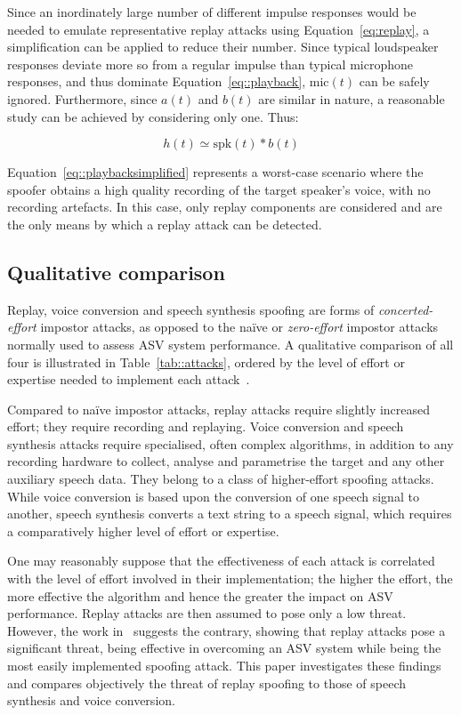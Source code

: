 Since an inordinately large number of different impulse responses would be needed to emulate representative replay attacks using Equation~\ref{eq:replay}, a simplification can be applied to reduce their number.  Since typical loudspeaker responses deviate more so from a regular impulse than typical microphone responses, and thus dominate Equation~\ref{eq::playback}, $\mathrm{mic}(t)$ can be safely ignored.  Furthermore, since $a(t)$ and $b(t)$ are similar in nature, a reasonable study can be achieved by considering only one.  Thus:

\begin{equation}
h(t) \simeq \mathrm{spk}(t) * b(t)
\label{eq::playbacksimplified}
\end{equation}

Equation~\ref{eq::playbacksimplified} represents a worst-case scenario where the spoofer obtains a high quality recording of the target speaker's voice, with no recording artefacts.  In this case, only replay components are considered and are the only means by which a replay attack can be detected.



\subsection{Qualitative comparison}
\label{sec::algorithms::comparison}



Replay, voice conversion and speech synthesis spoofing are forms of \emph{concerted-effort} impostor attacks, as opposed to the na\"{i}ve or \emph{zero-effort} impostor attacks normally used to assess ASV system performance.  A qualitative comparison of all four is illustrated in Table~\ref{tab::attacks}, ordered by the level of effort or expertise needed to implement each attack~\cite{Wu2014a}. 

Compared to na\"{i}ve impostor attacks, replay attacks require slightly increased effort; they require recording and replaying. Voice conversion and speech synthesis attacks require specialised, often complex algorithms, in addition to any recording hardware to collect, analyse and parametrise the target and any other auxiliary speech data.  They belong to a class of higher-effort spoofing attacks.  While voice conversion is based upon the conversion of one speech signal to another, speech synthesis converts a text string to a speech signal, which requires a comparatively higher level of effort or expertise.

One may reasonably suppose that the effectiveness of each attack is correlated with the level of effort involved in their implementation; the higher the effort, the more effective the algorithm and hence the greater the impact on ASV performance.  Replay attacks are then assumed to pose only a low threat.  However, the work in~\cite{Wu2014,Alegre2014} suggests the contrary, showing that replay attacks pose a significant threat, being effective in overcoming an ASV system while being the most easily implemented spoofing attack.  This paper investigates these findings and compares objectively the threat of replay spoofing to those of speech synthesis and voice conversion.
